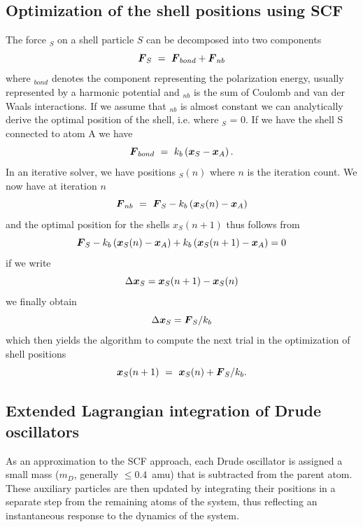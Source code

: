 \subsection{Optimization of the shell positions using SCF}
\label{subsec:shellscf}
The force $_S$ on a shell particle $S$ can be decomposed into two
components
\begin{equation}
\mbox{\boldmath ${F}$}_S ~=~ \mbox{\boldmath ${F}$}_{bond} + \mbox{\boldmath ${F}$}_{nb}
\end{equation}
where $_{bond}$ denotes the component representing the
polarization energy, usually represented by a harmonic potential and
$_{nb}$ is the sum of Coulomb and van der Waals interactions. If we
assume that $_{nb}$ is almost constant we can analytically derive the
optimal position of the shell, i.e. where $_S$ = 0. If we have the
shell S connected to atom A we have
\begin{equation}
\mbox{\boldmath ${F}$}_{bond} ~=~ k_b \left( \mbox{\boldmath ${x}$}_S - \mbox{\boldmath ${x}$}_A\right).
\end{equation}
In an iterative solver, we have positions $_S(n)$ where $n$ is
the iteration count. We now have at iteration $n$
\begin{equation}
\mbox{\boldmath ${F}$}_{nb} ~=~ \mbox{\boldmath ${F}$}_S - k_b \left( \mbox{\boldmath ${x}$}_S(n) - \mbox{\boldmath ${x}$}_A\right)
\end{equation}
and the optimal position for the shells $x_S(n+1)$ thus follows from
\begin{equation}
\mbox{\boldmath ${F}$}_S - k_b \left( \mbox{\boldmath ${x}$}_S(n) - \mbox{\boldmath ${x}$}_A\right) + k_b \left( \mbox{\boldmath ${x}$}_S(n+1) - \mbox{\boldmath ${x}$}_A\right) = 0
\end{equation}
if we write
\begin{equation}
\Delta \mbox{\boldmath ${x}$}_S = \mbox{\boldmath ${x}$}_S(n+1) - \mbox{\boldmath ${x}$}_S(n)
\end{equation}
we finally obtain
\begin{equation}
\Delta \mbox{\boldmath ${x}$}_S = \mbox{\boldmath ${F}$}_S/k_b
\end{equation}
which then yields the algorithm to compute the next trial in the optimization
of shell positions
\begin{equation}
\mbox{\boldmath ${x}$}_S(n+1) ~=~ \mbox{\boldmath ${x}$}_S(n) + \mbox{\boldmath ${F}$}_S/k_b.
\end{equation}

\subsection{Extended Lagrangian integration of Drude oscillators}
\label{subsec:drudemd}
As an approximation to the SCF approach, each Drude oscillator is assigned a small mass
($m_D$, generally $\leq 0.4$~amu) that is subtracted from the parent atom.  These auxiliary 
particles are then updated by integrating their positions in a separate step from the 
remaining atoms of the system, thus reflecting an instantaneous response to the dynamics of the system.  

